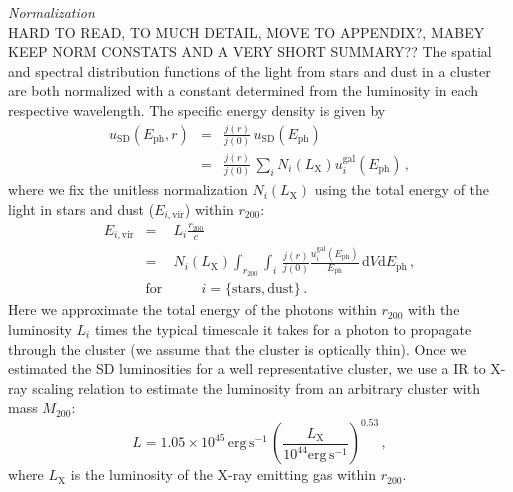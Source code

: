 \documentclass[10pt,aps,pra,reprint,amsmath,amsfonts,amssymb,showpacs]{revtex4-1}
\newcommand{\rmn}{\mathrm}
\newcommand{\ph}{\rmn{ph}}
\newcommand{\eph}{E_\ph}
\newcommand{\vir}{\rmn{vir}}
\newcommand{\gal}{\rmn{gal}}
\newcommand{\sd}{\rmn{SD}}
\newcommand{\lx}{L_\rmn{X}}
\newcommand{\dd}{\rmn{d}}
\newcommand{\rvir}{r_{200}}
\newcommand{\mvir}{M_{200}}
\begin{document}
{\it Normalization}\\ HARD TO READ, TO MUCH DETAIL, MOVE TO APPENDIX?,
MABEY KEEP NORM CONSTATS AND A VERY SHORT SUMMARY?? The spatial and
spectral distribution functions of the light from stars and dust in a
cluster are both normalized with a constant determined from the
luminosity in each respective wavelength. The specific energy density
is given by
\begin{eqnarray} 
u_\sd(\eph, r) &=& \frac{j(r)}{j(0)}\,u_\sd(\eph) \nonumber\\
&=& \frac{j(r)}{j(0)}\,\sum_i N_i(\lx) u_i^\gal(\eph)\,,
\end{eqnarray}
where we fix the unitless normalization $N_i(\lx)$ using the total
energy of the light in stars and dust ($E_{i,\vir}$) within $\rvir$:
\begin{eqnarray} 
  E_{i,\vir} &=& L_i \frac{\rvir}{c} \nonumber \\
  &=&N_i(\lx)\int_{\rvir} \int_i \,\frac{j(r)}{j(0)} 
  \frac{u_i^\gal(\eph)}{\eph}\,\dd V\dd \eph\,,\nonumber \\
 &\rmn{for}&\qquad i=\{\rmn{stars,dust}\}\,.
\label{eq:E_SD}
\end{eqnarray}
Here we approximate the total energy of the photons within $\rvir$
with the luminosity $L_i$ \cite{2008A&A...490..547G} times the typical
timescale it takes for a photon to propagate through the cluster (we
assume that the cluster is optically thin). Once we estimated the SD
luminosities for a well representative cluster, we use a IR to X-ray
scaling relation to estimate the luminosity from an arbitrary cluster
with mass $\mvir$:
\begin{equation}
L=1.05\times10^{45}\,\rmn{erg\,s}^{-1}\,
\left(\frac{\lx}{10^{44}\rmn{erg\,s}^{-1}}\right)^{0.53}\,,
\label{eq:SD-X}
\end{equation}
where $\lx$ is the luminosity of the X-ray emitting gas within
$\rvir$.
\end{document}
